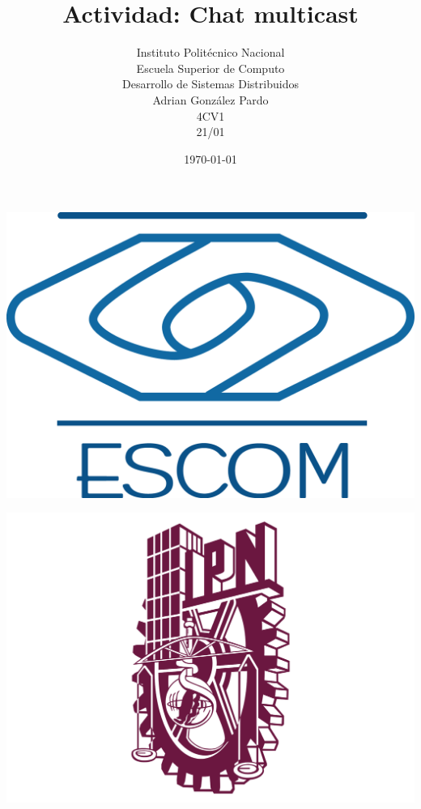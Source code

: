 \documentclass[10pt,executivepaper]{article}
\title{Actividad: Chat multicast}
\author{Instituto Politécnico Nacional\\Escuela Superior de Computo\\Desarrollo de Sistemas Distribuidos\\Adrian González Pardo\\4CV1\\21/01}
\date{\today}
\begin{document}
\begin{minipage}{0.4\textwidth}
	\begin{flushleft}
		\includegraphics[scale = 0.05]{logoescom.png}
	\end{flushleft}
\end{minipage}
\begin{minipage}{0.51\textwidth}
	\begin{flushright}
		\includegraphics[scale = 0.055]{logoipn.png}
	\end{flushright}
\end{minipage}
\end{document}
